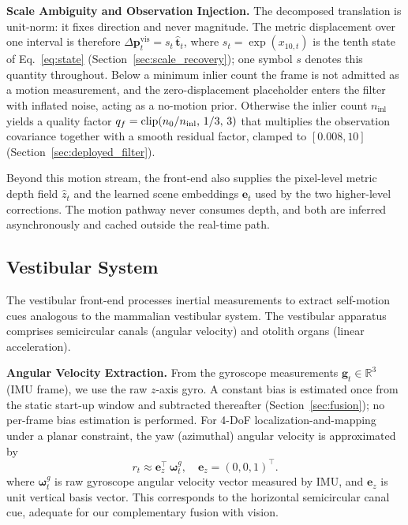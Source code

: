 \textbf{Scale Ambiguity and Observation Injection.} The decomposed translation is unit-norm: it fixes direction and never magnitude. The metric displacement over one interval is therefore $\Delta\mathbf{p}^{\mathrm{vis}}_t = s_t\,\hat{\mathbf{t}}_t$, where $s_t=\exp(x_{10,t})$ is the tenth state of Eq.~\eqref{eq:state} (Section~\ref{sec:scale_recovery}); one symbol $s$ denotes this quantity throughout. Below a minimum inlier count the frame is not admitted as a motion measurement, and the zero-displacement placeholder enters the filter with inflated noise, acting as a no-motion prior. Otherwise the inlier count $n_{\mathrm{inl}}$ yields a quality factor $q_f=\operatorname{clip}(n_0/n_{\mathrm{inl}},\,1/3,\,3)$ that multiplies the observation covariance together with a smooth residual factor, clamped to $[0.008,10]$ (Section~\ref{sec:deployed_filter}).

Beyond this motion stream, the front-end also supplies the pixel-level metric depth field $\hat z_t$ and the learned scene embeddings $\boldsymbol{e}_t$ used by the two higher-level corrections. The motion pathway never consumes depth, and both are inferred asynchronously and cached outside the real-time path.

\subsection{Vestibular System}
\label{sec:vestibular}

The vestibular front-end processes inertial measurements to extract self-motion cues analogous to the mammalian ves\-tib\-u\-lar system. The ves\-tib\-u\-lar apparatus comprises semicircular canals (angular velocity) and otolith organs (linear acceleration).

\textbf{Angular Velocity Extraction.} From the gyroscope measurements $\mathbf{g}_t\in\mathbb{R}^3$ (IMU frame), we use the raw $z$-axis gyro. A constant bias is estimated once from the static start-up window and subtracted thereafter (Section~\ref{sec:fusion}); no per-frame bias estimation is performed. For 4-DoF lo\-cal\-i\-za\-tion-and-map\-ping under a planar constraint, the yaw (azimuthal) angular velocity is approximated by
\begin{equation}
    r_t \approx \mathbf{e}_z^\top\,\boldsymbol{\omega}_t^g,\quad \mathbf{e}_z=(0,0,1)^\top.
\end{equation}
where $\boldsymbol{\omega}_t^g$ is raw gyroscope angular velocity vector measured by IMU, and $\mathbf{e}_z$ is unit vertical basis vector.
This corresponds to the horizontal semicircular canal cue, adequate for our complementary fusion with vision.

